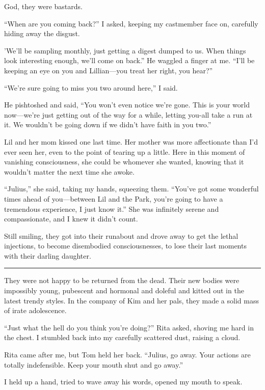God, they were bastards.

“When are you coming back?” I asked, keeping my castmember face on,
carefully hiding away the disgust.

'We'll be sampling monthly, just getting a digest dumped to us.
When things look interesting enough, we'll come on back.” He
waggled a finger at me. “I'll be keeping an eye on you and
Lillian—you treat her right, you hear?”

“We're sure going to miss you two around here,” I said.

He pishtoshed and said, “You won't even notice we're gone. This is
your world now—we're just getting out of the way for a while,
letting you-all take a run at it. We wouldn't be going down if we
didn't have faith in you two.”

Lil and her mom kissed one last time. Her mother was more
affectionate than I'd ever seen her, even to the point of tearing
up a little. Here in this moment of vanishing consciousness, she
could be whomever she wanted, knowing that it wouldn't matter the
next time she awoke.

“Julius,” she said, taking my hands, squeezing them. “You've got
some wonderful times ahead of you—between Lil and the Park, you're
going to have a tremendous experience, I just know it.” She was
infinitely serene and compassionate, and I knew it didn't count.

Still smiling, they got into their runabout and drove away to get
the lethal injections, to become disembodied consciousnesses, to
lose their last moments with their darling daughter.

\begin{center}\rule{3in}{0.4pt}\end{center}

They were not happy to be returned from the dead. Their new bodies
were impossibly young, pubescent and hormonal and doleful and
kitted out in the latest trendy styles. In the company of Kim and
her pals, they made a solid mass of irate adolescence.

“Just what the hell do you think you're doing?” Rita asked, shoving
me hard in the chest. I stumbled back into my carefully scattered
dust, raising a cloud.

Rita came after me, but Tom held her back. “Julius, go away. Your
actions are totally indefensible. Keep your mouth shut and go
away.”

I held up a hand, tried to wave away his words, opened my mouth to
speak.

